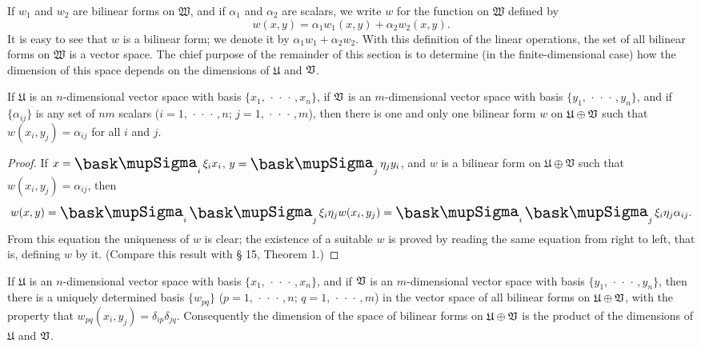 If \(w_1\) and \(w_2\) are bilinear forms on \(\mathfrak{W}\), and if \(\alpha_1\)
and \(\alpha_2\) are scalars, we write \(w\) for the function on \(\mathfrak{W}\)
defined by
\begin{equation*}
    w(x,y) = \alpha_1 w_1(x,y) + \alpha_2 w_2(x,y).
\end{equation*}
It is easy to see that \(w\) is a bilinear form; we denote it by \(\alpha_1 w_1
+ \alpha_2 w_2\). With this definition of the linear operations, the set of all
bilinear forms on \(\mathfrak{W}\) is a vector space. The chief purpose of the
remainder of this section is to determine (in the finite-dimensional case) how
the dimension of this space depends on the dimensions of \(\mathfrak{U}\) and
\(\mathfrak{V}\).

\begin{theorem}
    If \(\mathfrak{U}\) is an \(n\)-dimensional vector space with basis \(\{x_1,
    \,\cdot\,\cdot\,\cdot\,, x_n\}\), if \(\mathfrak{V}\) is an \(m\)-dimensional
    vector space with basis \(\{y_1, \,\cdot\,\cdot\,\cdot\,, y_n\}\), and if
    \(\{\alpha_{ij}\}\) is any set of \(nm\) scalars (\(i = 1,
    \,\cdot\,\cdot\,\cdot\,, n\); \(j = 1, \,\cdot\,\cdot\,\cdot\,, m\)), then
    there is one and only one bilinear form \(w\) on \(\mathfrak{U} \oplus \mathfrak{V}\)
    such that \(w(x_i, y_j) = \alpha_{ij}\) for all \(i\) and \(j\).
\end{theorem}

\begin{proof}
    If \(x = \sumx_i \xi_i x_i\), \(y = \sumx_j \eta_j y_i\), and \(w\) is a
    bilinear form on \(\mathfrak{U} \oplus \mathfrak{V}\) such that \(w(x_i, y_j) =
    \alpha_{ij}\), then
    \begin{equation*}
        w(x, y) = \sumx_i \sumx_j \xi_i \eta_j w(x_i, y_j) = \sumx_i \sumx_j \xi_i \eta_j \alpha_{ij}.
    \end{equation*}
    From this equation the uniqueness of \(w\) is clear; the existence of a
    suitable \(w\) is proved by reading the same equation from right to left,
    that is, defining \(w\) by it. (Compare this result with § 15, Theorem 1.)
\end{proof}

\begin{theorem}
    If \(\mathfrak{U}\) is an \(n\)-dimensional vector space with basis \(\{x_1,
    \,\cdot\,\cdot\,\cdot\,, x_n\}\), and if \(\mathfrak{V}\) is an \(m\)-dimensional
    vector space with basis \(\{y_1, \,\cdot\,\cdot\,\cdot\,, y_n\}\), then
    there is a uniquely determined basis \(\{w_{pq}\}\) (\(p = 1,
    \,\cdot\,\cdot\,\cdot\,, n\); \(q = 1, \,\cdot\,\cdot\,\cdot\,, m\)) in the
    vector space of all bilinear forms on \(\mathfrak{U} \oplus \mathfrak{V}\), with the
    property that \(w_{pq}(x_i, y_j) = \delta_{ip}\delta_{jq}\). Consequently
    the dimension of the space of bilinear forms on \(\mathfrak{U} \oplus \mathfrak{V}\)
    is the product of the dimensions of \(\mathfrak{U}\) and \(\mathfrak{V}\).
\end{theorem}

